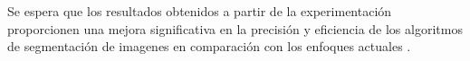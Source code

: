 Se espera que los resultados obtenidos a partir de la experimentación proporcionen una mejora significativa en la precisión y eficiencia de los algoritmos de segmentación de imagenes en comparación con los enfoques actuales \cite{aponte2022}.
